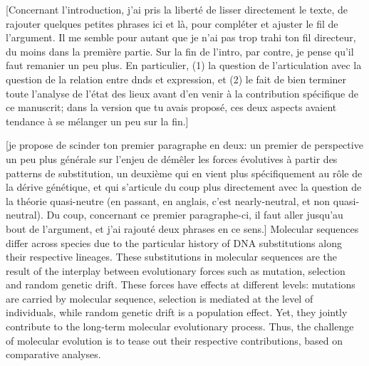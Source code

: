 \documentclass{article}
\begin{document}
	[Concernant l'introduction, j'ai pris la liberté de lisser directement le texte, de rajouter quelques petites phrases ici et là, pour compléter et ajuster le fil de l'argument. Il me semble pour autant que je n'ai pas trop trahi ton fil directeur, du moins dans la première partie. Sur la fin de l'intro, par contre, je pense qu'il faut remanier un peu plus. En particulier, (1) la question de l'articulation avec la question de la relation entre dnds et expression, et (2) le fait de bien terminer toute l'analyse de l'état des lieux avant d'en venir à la contribution spécifique de ce manuscrit; dans la version que tu avais proposé, ces deux aspects avaient tendance à se mélanger un peu sur la fin.]
	
	[je propose de scinder ton premier paragraphe en deux: un premier de perspective un peu plus générale sur l'enjeu de démêler les forces évolutives à partir des patterns de substitution, un deuxième qui en vient plus spécifiquement au rôle de la dérive génétique, et qui s'articule du coup plus directement avec la question de la théorie quasi-neutre (en passant, en anglais, c'est nearly-neutral, et non quasi-neutral). Du coup, concernant ce premier paragraphe-ci, il faut aller jusqu'au bout de l'argument, et j'ai rajouté deux phrases en ce sens.]
	Molecular sequences differ across species due to the particular history of DNA substitutions along their respective lineages.
	These substitutions in molecular sequences are the result of the interplay between evolutionary forces such as mutation, selection and random genetic drift.
	These forces have effects at different levels: mutations are carried by molecular sequence, selection is mediated at the level of individuals, while random genetic drift is a population effect.
	Yet, they jointly contribute to the long-term molecular evolutionary process.
	Thus, the challenge of molecular evolution is to tease out their respective contributions, based on comparative analyses.
	
\end{document}
